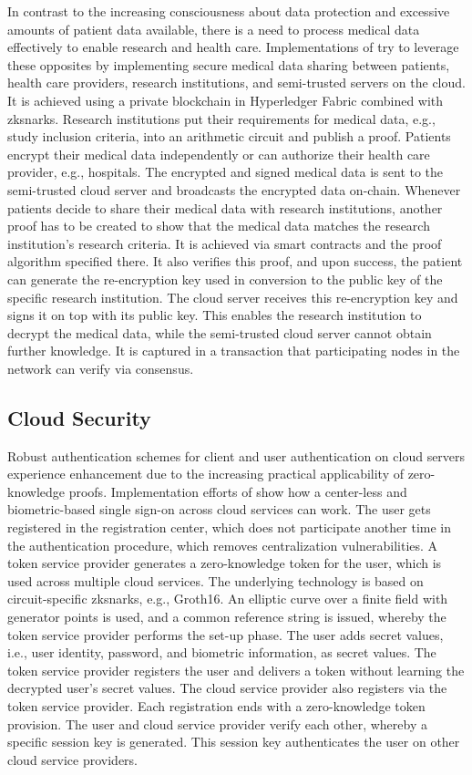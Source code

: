 In contrast to the increasing consciousness about data protection and excessive amounts of patient data available, there is a need to process medical data effectively to enable research and health care. Implementations of \citet{Huangetal} try to leverage these opposites by implementing secure medical data sharing between patients, health care providers, research institutions, and semi-trusted servers on the cloud. It is achieved using a private blockchain in Hyperledger Fabric combined with \acrshort{zksnark}s. Research institutions put their requirements for medical data, e.g., study inclusion criteria, into an arithmetic circuit and publish a proof. Patients encrypt their medical data independently or can authorize their health care provider, e.g., hospitals. The encrypted and signed medical data is sent to the semi-trusted cloud server and broadcasts the encrypted data on-chain. Whenever patients decide to share their medical data with research institutions, another proof has to be created to show that the medical data matches the research institution's research criteria. It is achieved via smart contracts and the proof algorithm specified there. It also verifies this proof, and upon success, the patient can generate the re-encryption key used in conversion to the public key of the specific research institution. The cloud server receives this re-encryption key and signs it on top with its public key. This enables the research institution to decrypt the medical data, while the semi-trusted cloud server cannot obtain further knowledge. It is captured in a transaction that participating nodes in the network can verify via consensus.

\subsection{Cloud Security}
Robust authentication schemes for client and user authentication on cloud servers experience enhancement due to the increasing practical applicability of zero-knowledge proofs. Implementation efforts of \citet{LiuWangPengXing} show how a center-less and biometric-based single sign-on across cloud services can work. The user gets registered in the registration center, which does not participate another time in the authentication procedure, which removes centralization vulnerabilities. A token service provider generates a zero-knowledge token for the user, which is used across multiple cloud services. The underlying technology is based on circuit-specific \acrshort{zksnark}s, e.g., Groth16. An elliptic curve over a finite field with generator points is used, and a common reference string is issued, whereby the token service provider performs the set-up phase. The user adds secret values, i.e., user identity, password, and biometric information, as secret values. The token service provider registers the user and delivers a token without learning the decrypted user's secret values. The cloud service provider also registers via the token service provider. Each registration ends with a zero-knowledge token provision. The user and cloud service provider verify each other, whereby a specific session key is generated. This session key authenticates the user on other cloud service providers.  

